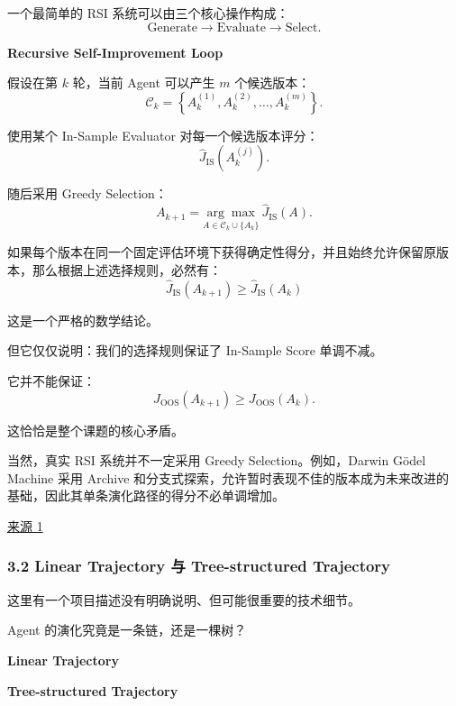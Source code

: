 一个最简单的 RSI 系统可以由三个核心操作构成：
\[\text{Generate}
\longrightarrow
\text{Evaluate}
\longrightarrow
\text{Select}.\]

\textbf{Recursive Self-Improvement Loop}


假设在第 \(k\) 轮，当前 Agent 可以产生 \(m\) 个候选版本：
\[\mathcal C_k
=
\left\{
A_k^{(1)},A_k^{(2)},\ldots,A_k^{(m)}
\right\}.\]

使用某个 In-Sample Evaluator 对每一个候选版本评分：
\[\widehat J_{\mathrm{IS}}
\left(A_k^{(j)}\right).\]

随后采用 Greedy Selection：
\[A_{k+1}
=
\underset{A\in\mathcal C_k\cup\{A_k\}}
{\arg\max}
\ \widehat J_{\mathrm{IS}}(A).\]

如果每个版本在同一个固定评估环境下获得确定性得分，并且始终允许保留原版本，那么根据上述选择规则，必然有：
\[\boxed{
\widehat J_{\mathrm{IS}}(A_{k+1})
\geq
\widehat J_{\mathrm{IS}}(A_k)
}\]

这是一个严格的数学结论。

但它仅仅说明：我们的选择规则保证了 In-Sample Score 单调不减。

它并不能保证：
\[J_{\mathrm{OOS}}(A_{k+1})
\geq
J_{\mathrm{OOS}}(A_k).\]

这恰恰是整个课题的核心矛盾。

当然，真实 RSI 系统并不一定采用 Greedy Selection。例如，Darwin Gödel Machine 采用 Archive 和分支式探索，允许暂时表现不佳的版本成为未来改进的基础，因此其单条演化路径的得分不必单调增加。

\href{https://arxiv.org/abs/2505.22954}{来源 1}

\hypertarget{part-1-07-0001-linear-trajectory-ux4e0e-tree-structured-trajectory}{%
\subsubsection{3.2 Linear Trajectory 与 Tree-structured Trajectory}\label{part-1-07-0001-linear-trajectory-ux4e0e-tree-structured-trajectory}}

这里有一个项目描述没有明确说明、但可能很重要的技术细节。

Agent 的演化究竟是一条链，还是一棵树？

\textbf{Linear Trajectory}


\textbf{Tree-structured Trajectory}


